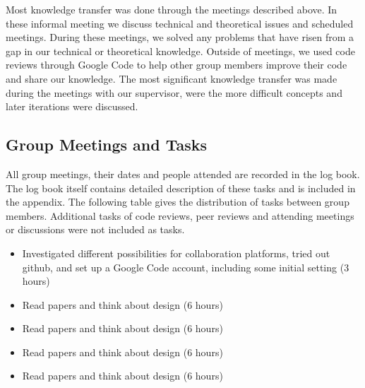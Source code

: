 Most knowledge transfer was done through the meetings described above. In these informal meeting we discuss technical and theoretical issues
and scheduled meetings. During these meetings, we solved any problems that have risen
from a gap in our technical or theoretical knowledge. Outside of meetings, we used code
reviews through Google Code to help other group members improve their code and share
our knowledge. The most significant knowledge transfer was made during the meetings with our supervisor, were the more difficult concepts and later iterations were discussed.

\subsection*{Group Meetings and Tasks}

All group meetings, their dates and people attended are recorded in the log book. The log book itself contains detailed description of these tasks and is included in the appendix. The following table gives the distribution of tasks between group members. Additional tasks of code reviews, peer reviews and attending meetings or discussions were not included as tasks.

%
{ \begin{itemize} 
    \item Investigated different possibilities for collaboration platforms,
tried out github, and set up a Google Code account, including some
initial setting (3 hours)
    \item Read papers and think about design (6 hours)
 \end{itemize} 
}%
{ \begin{itemize} 
    \item Read papers and think about design (6 hours)
 \end{itemize} 
}%
{ \begin{itemize} 
    \item Read papers and think about design (6 hours)
 \end{itemize} 
}%
{ \begin{itemize} 
    \item Read papers and think about design (6 hours)
 \end{itemize} 
}%

